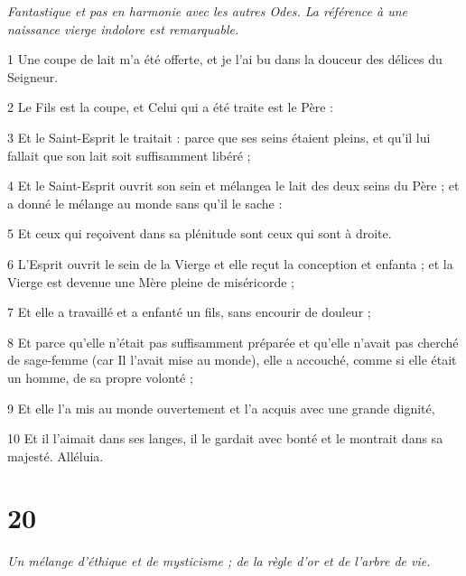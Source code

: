 \par \textit{Fantastique et pas en harmonie avec les autres Odes. La référence à une naissance vierge indolore est remarquable.}

\par 1 Une coupe de lait m'a été offerte, et je l'ai bu dans la douceur des délices du Seigneur.
\par 2 Le Fils est la coupe, et Celui qui a été traite est le Père :
\par 3 Et le Saint-Esprit le traitait : parce que ses seins étaient pleins, et qu'il lui fallait que son lait soit suffisamment libéré ;
\par 4 Et le Saint-Esprit ouvrit son sein et mélangea le lait des deux seins du Père ; et a donné le mélange au monde sans qu'il le sache :
\par 5 Et ceux qui reçoivent dans sa plénitude sont ceux qui sont à droite.
\par 6 L'Esprit ouvrit le sein de la Vierge et elle reçut la conception et enfanta ; et la Vierge est devenue une Mère pleine de miséricorde ;
\par 7 Et elle a travaillé et a enfanté un fils, sans encourir de douleur ;
\par 8 Et parce qu'elle n'était pas suffisamment préparée et qu'elle n'avait pas cherché de sage-femme (car Il l'avait mise au monde), elle a accouché, comme si elle était un homme, de sa propre volonté ;
\par 9 Et elle l'a mis au monde ouvertement et l'a acquis avec une grande dignité,
\par 10 Et il l'aimait dans ses langes, il le gardait avec bonté et le montrait dans sa majesté. Alléluia.

\chapter{20}

\par \textit{Un mélange d'éthique et de mysticisme ; de la règle d'or et de l'arbre de vie.}

